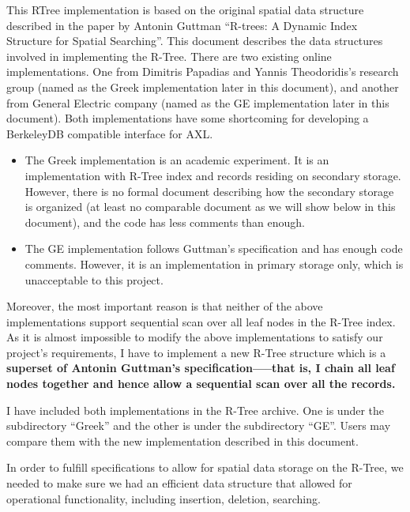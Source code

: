 \documentclass[12pt]{article}
\begin{document}
This RTree implementation is based on the original spatial data
structure described in the paper by Antonin Guttman ``R-trees: A
Dynamic Index Structure for Spatial Searching''. This document
describes the data structures involved in implementing the
R-Tree.  There are two existing online implementations.  One from
Dimitris Papadias and Yannis Theodoridis's research group (named
as the Greek implementation later in this document), and another
from General Electric company (named as the GE implementation
later in this document).  Both implementations have some
shortcoming for developing a BerkeleyDB compatible interface for
AXL.
\begin{itemize}
\item The Greek implementation is an academic experiment.  It is
      an implementation with R-Tree index and records residing on
      secondary storage.  However, there is no formal document
      describing how the secondary storage is organized (at least
      no comparable document as we will show below in this
      document), and the code has less comments than enough.
\item The GE implementation follows Guttman's specification and
      has enough code comments.  However, it is an implementation
      in primary storage only, which is unacceptable to this
      project.
\end{itemize}
Moreover, the most important reason is that neither of the above
implementations support sequential scan over all leaf nodes in the
R-Tree index.  As it is almost impossible to modify the above
implementations to satisfy our project's requirements, I have to
implement a new R-Tree structure which is a {\bf superset of
Antonin Guttman's specification-----that is, I chain all leaf
nodes together and hence allow a sequential scan over all the
records.}

I have included both implementations in the R-Tree archive.  One
is under the subdirectory ``Greek'' and the other is under the
subdirectory ``GE''.  Users may compare them with the new
implementation described in this document.

In order to fulfill specifications to allow for spatial
data storage on the R-Tree, we needed to make sure we had an
efficient data structure that allowed for operational
functionality, including insertion, deletion, searching.
\end{document}
